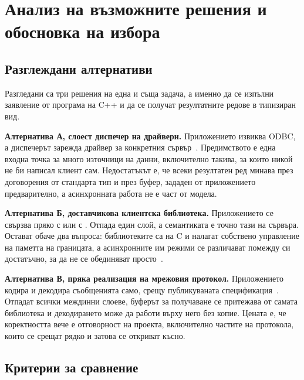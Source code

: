 \section{Анализ на възможните решения и обосновка на избора}
\label{sec:alternatives}

\subsection{Разглеждани алтернативи}

Разгледани са три решения на една и съща задача, а именно да се изпълни заявление от
програма на C++ и да се получат резултатните редове в типизиран вид.

\textbf{Алтернатива А, слоест диспечер на драйвери.} Приложението извиква ODBC, а
диспечерът зарежда драйвер за конкретния сървър~\cite{odbc_ref}. Предимството е една
входна точка за много източници на данни, включително такива, за които никой не би
написал клиент сам. Недостатъкът е, че всеки резултатен ред минава през договорения от
стандарта тип и през буфер, зададен от приложението предварително, а асинхронната
работа не е част от модела.

\textbf{Алтернатива Б, доставчикова клиентска библиотека.} Приложението се свързва
пряко с  или с . Отпада един слой, а семантиката е
точно тази на сървъра. Остават обаче два въпроса: библиотеките са на C и налагат
собствено управление на паметта на границата, а асинхронните им режими се различават
помежду си достатъчно, за да не се обединяват просто~\cite{libpq}.

\textbf{Алтернатива В, пряка реализация на мрежовия протокол.} Приложението кодира и
декодира съобщенията само, срещу публикуваната спецификация~\cite{pg_protocol,
mysql_protocol}. Отпадат всички междинни слоеве, буферът за получаване се притежава от
самата библиотека и декодирането може да работи върху него без копие. Цената е, че
коректността вече е отговорност на проекта, включително частите на протокола, които се
срещат рядко и затова се откриват късно.

\subsection{Критерии за сравнение}

